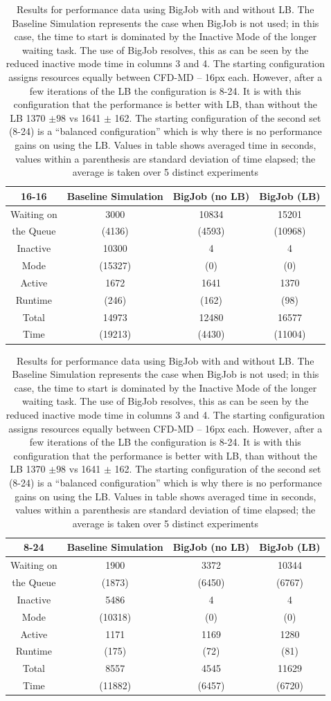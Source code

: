 \documentclass[conference,final]{IEEEtran}
\begin{document}
\setlength{\tabcolsep}{1pt}
\begin{table}[!ht]
\begin{center}

\caption{\small Results for performance data using BigJob with and without LB. The Baseline Simulation represents the case when BigJob is not used; in this case, the time to start is dominated by the Inactive Mode of the longer waiting task. The use of BigJob resolves, this as can be seen by the reduced inactive mode time in columns 3 and 4. The starting configuration assigns resources equally between CFD-MD -- 16px each. However, after a few iterations of the LB the configuration is 8-24. It is with this configuration that the performance is better with LB, than without the LB 1370 $\pm 98$ vs 1641 $\pm$ 162. The starting configuration of the second set (8-24) is a ``balanced configuration'' which is why there is no performance gains on using the LB. Values in table shows averaged time in seconds, values within a parenthesis are standard deviation of time elapsed; the average is taken over 5 distinct experiments}
\label{table:oneBJ_Test}
\begin{tabular}{ c|| c | c | c }
\hline
16-16 & Baseline Simulation & BigJob (no LB) & BigJob (LB) \\
\hline
\hline
Waiting on & 3000     & 10834  & 15201  \\
the Queue  & (4136)   & (4593) & (10968) \\
\hline
Inactive   & 10300    & 4      & 4  \\
Mode       & (15327)  & (0)    & (0) \\
\hline
Active     & 1672     & 1641   & 1370 \\
Runtime    & (246)    & (162)  & (98) \\
\hline
Total      & 14973    & 12480  & 16577 \\
Time       & (19213)  & (4430) & (11004) \\
\hline
\end{tabular}
\begin{tabular}{ c|| c | c | c }
\hline
8-24 & Baseline Simulation & BigJob (no LB) & BigJob (LB) \\
\hline
\hline
Waiting on & 1900 & 3372 & 10344  \\
the Queue & (1873) & (6450) & (6767) \\
\hline
Inactive & 5486 & 4 & 4 \\
Mode & (10318) & (0) & (0) \\
\hline
Active & 1171 & 1169 & 1280 \\
Runtime & (175) & (72) & (81) \\
\hline
Total & 8557 & 4545 & 11629 \\
Time & (11882) & (6457) & (6720) \\
\hline
\end{tabular}
\end{center}
\end{table}
\end{document}
